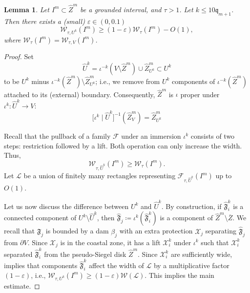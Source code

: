\documentclass{amsart}
\newcommand{\1}{{\mathbb 1 }}
\newcommand{\Fam}{{\mathcal F}}
\newcommand{\Width}{{\mathcal W}}
\newcommand\LL{{\mathcal L}}
\newcommand\XX{\mathcal{X}}
\newcommand{\wZ}{{\widehat Z}}
\newcommand{\qq}{\mathfrak{q}}
\newtheorem{lem}[thm]{Lemma}
\theoremstyle{remark}
\numberwithin{equation}{section}
\theoremstyle{definition}
\begin{document}
\begin{lem}\label{lem:liftingviaiota}
Let $I^m \subset \wZ^m$ be a grounded interval, and $\tau > 1$. Let $k \leq 10\qq_{m+1}$.
Then there exists a (small) $\varepsilon \in (0,0.1)$
$$
\Width_{\tau, U^k}(I^m) \ge (1-\varepsilon) \Width_{\tau}(I^m) - O(1),
$$
where $\Width_{\tau}(I^m) = \Width_{\tau, V}(I^m)$.
\end{lem}
\begin{proof}
   Set 
\begin{equation}
  \label{eq:dfn:wU^k}
   \widehat U^k =  \iota^{-k}(V \setminus \wZ^m) \cup \wZ^m_{U^k}\subset U^k
\end{equation}   
      to be $U^k$ minus $\iota^{-k}(\wZ^m)\setminus \wZ^m_{U^k}$; i.e., we remove from $U^k$ components of $\iota^{-k}(\wZ^m)$ attached to its (external) boundary. Consequently, $\wZ^m$ is $\iota$ proper under $\iota^k\colon \widehat U^k\to V$:
      \begin{equation}
          \label{eq:wU^k:proper} \big[\iota^k\mid \widehat U^k\big]^{-1} (\wZ^m_V)=\wZ^m_{U^k}
      \end{equation}



  Recall that the pullback of a family $\Fam$ under an immersion $\iota^k$ consists of two steps: restriction followed by a lift.  Both operation can only increase the width. Thus,
   $$
   \Width_{\tau, \widehat U^k}(I^m) \geq \Width_\tau(I^m).
   $$
Let $\LL$ be a union of finitely many rectangles representing $\Fam_{\tau, \widehat U^k}(I^m)$ up to $O(1)$.
   

Let us now discuss the difference between $U^k$ and $\widehat U^k$. By construction,  if $\widehat{\mathfrak F}^k_i$ is a connected component of $U^k\setminus \widehat U^k$, then $\widehat{\mathfrak F}_j\coloneqq \iota^k(\widehat{\mathfrak F}^k_i)$ is a component of $\wZ^m\setminus \overline Z$. We recall that $\widehat{\mathfrak F}_j$ is bounded by a dam $\beta_j$ with an extra protection $\XX_j$ separating $\widehat{\mathfrak F}_j$ from $\partial V$. Since $\XX_j$ is in the coastal zone, it has a lift $\XX_i^k$ under $\iota^{k}$ such that $\XX_i^k$ separated $\widehat{\mathfrak F}^k_i$ from the pseudo-Siegel disk $\wZ^m$. Since $\XX_i^k$ are sufficiently wide, \cite[Lemma 5.6]{DL22} implies that components $\widehat{\mathfrak F}^k_i$ affect the width of $\LL$ by a multiplicative factor $(1-\varepsilon)$, i.e., $\Width_{\tau, U^k}(I^m) \ge (1-\varepsilon) \Width(\LL)$.
This implies the main estimate.  
\end{proof}
\end{document}
